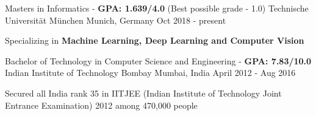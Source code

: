 \begin{cventries}
	\cventry
	{Masters in Informatics - \textbf{GPA: 1.639/4.0} (Best possible grade - 1.0)} %
	{Technische Universität München} %
	{Munich, Germany} %
	{Oct 2018 - present} %
	{
		\begin{cvitems}
			\item {Specializing in \textbf{Machine Learning, Deep Learning and Computer Vision}}
		\end{cvitems}
    }
  	\cventry
    {Bachelor of Technology in Computer Science and Engineering - \textbf{GPA: 7.83/10.0}} %
    {Indian Institute of Technology Bombay} %
    {Mumbai, India} %
    {April 2012 - Aug 2016} %
    {
		\begin{cvitems}
			\item {Secured all India rank 35 in IITJEE (Indian Institute of Technology Joint Entrance Examination) 2012 among 470,000 people}
		\end{cvitems}
    }
\end{cventries}
